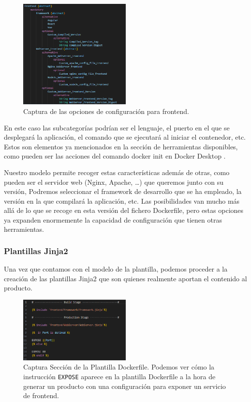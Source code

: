 \documentclass[12pt, a4paper, twoside]{article}
\begin{document}
\begin{figure}[h]
	\centering
	  \includegraphics[width=0.5\textwidth]{Dockerfile.frontend.png}
	\caption{Captura de las opciones de configuración para frontend.}
\end{figure}

En este caso las subcategorías podrían ser el lenguaje, el puerto en el que se desplegará la aplicación, el comando que se ejecutará al iniciar el contenedor, etc.
Estos son elementos ya mencionados en la sección de herramientas disponibles, como pueden ser las acciones del comando docker init en Docker Desktop \cite{docker_desktop}.  

Nuestro modelo permite recoger estas características además de otras,
como pueden ser el servidor web (Nginx, Apache, \ldots) que queremos junto con su versión, Podremos seleccionar el framework de desarrollo que se ha empleado, la versión en la que compilará la aplicación, etc.
Las posibilidades van mucho más allá de lo que se recoge en esta versión del fichero Dockerfile, pero estas opciones ya expanden enormemente la capacidad de configuración que tienen otras herramientas. 



\subsubsection{Plantillas Jinja2}
Una vez que contamos con el modelo de la plantilla, podemos proceder a la creación de las plantillas Jinja2 que son quienes realmente aportan el contenido al producto.

\begin{figure}[h]
	\centering
	  \includegraphics[width=0.5\textwidth]{Dockerfile.frontend.jinja.template.png}
	\caption{Captura Sección de la Plantilla Dockerfile. Podemos ver cómo la instrucción \texttt{EXPOSE} aparece en la plantilla Dockerfile a la hora de generar un producto con una configuración para exponer un servicio de frontend.}   
\end{figure}
\end{document}
